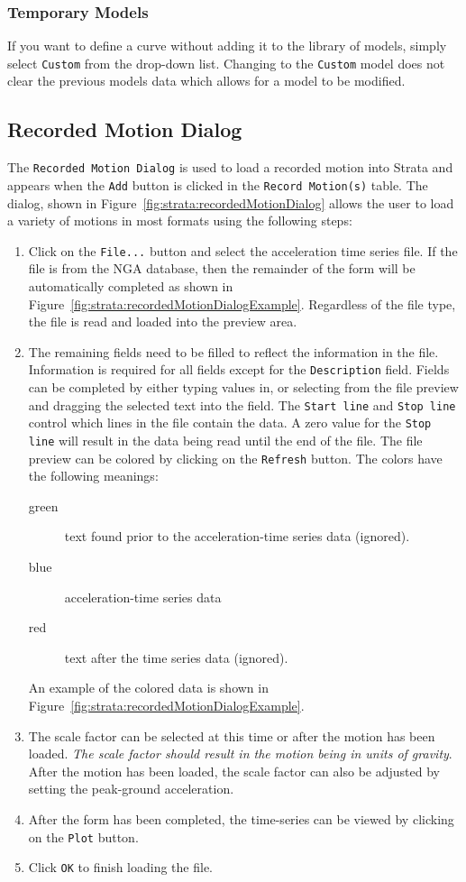 \documentclass[11pt]{report}
\begin{document}
\subsubsection{Temporary Models}
If you want to define a curve without adding it to the library of models, simply select
\texttt{Custom} from the drop-down list.  Changing to the \texttt{Custom} model does not clear the
previous models data which allows for a model to be modified.

\subsection{Recorded Motion Dialog}\label{ch:strata:particulars:motionDialog}
The \texttt{Recorded Motion Dialog} is used to load a recorded motion into Strata and appears when
the \texttt{Add} button is clicked in the \texttt{Record Motion(s)} table.  The dialog, shown in
Figure~\ref{fig:strata:recordedMotionDialog} allows the user to load a variety of motions in most
formats using the following steps:
\begin{enumerate}
  \item Click on the \texttt{File...} button and select the acceleration time series file.  If the
	file is from the NGA database, then the remainder of the form will be automatically completed as
	shown in Figure~\ref{fig:strata:recordedMotionDialogExample}.  Regardless of the file type, the
	file is read and loaded into the preview area.
  \item The remaining fields need to be filled to reflect the information in the file.  Information is
	required for all fields except for the \texttt{Description} field.  Fields can be
	completed by either typing values in, or selecting from the file preview and dragging the selected
	text into the field. The \texttt{Start line} and \texttt{Stop line} control which lines in the file
	contain the data.  A zero value for the \texttt{Stop line} will result in the data being read until
	the end of the file.  The file preview can be colored by clicking on the \texttt{Refresh} button.
	The colors have the following meanings:
	\begin{description}
	  \item[green] text found prior to the acceleration-time series data (ignored).
	  \item[blue] acceleration-time series data
	  \item[red] text after the time series data (ignored).
	\end{description}
	An example of the colored data is shown in Figure~\ref{fig:strata:recordedMotionDialogExample}.
  \item The scale factor can be selected at this time or after the motion has been loaded.  \emph{The scale
	factor should result in the motion being in units of gravity}.  After the motion has been loaded,
	the scale factor can also be adjusted by setting the peak-ground acceleration.
  \item After the form has been completed, the time-series can be viewed by clicking on the
	\texttt{Plot} button.
  \item Click \texttt{OK} to finish loading the file.
\end{enumerate} 
\end{document}
